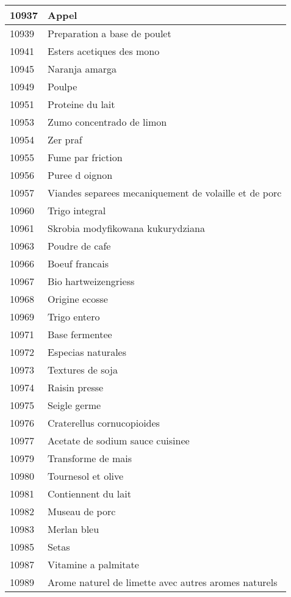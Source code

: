 \begin{longtable}{|l|l|}
10937 & Appel \\ \hline 
10939 & Preparation a base de poulet \\ \hline 
10941 & Esters acetiques des mono \\ \hline 
10945 & Naranja amarga \\ \hline 
10949 & Poulpe \\ \hline 
10951 & Proteine du lait \\ \hline 
10953 & Zumo concentrado de limon \\ \hline 
10954 & Zer praf \\ \hline 
10955 & Fume par friction \\ \hline 
10956 & Puree d oignon \\ \hline 
10957 & Viandes separees mecaniquement de volaille et de porc \\ \hline 
10960 & Trigo integral \\ \hline 
10961 & Skrobia modyfikowana kukurydziana \\ \hline 
10963 & Poudre de cafe \\ \hline 
10966 & Boeuf francais \\ \hline 
10967 & Bio hartweizengriess \\ \hline 
10968 & Origine ecosse \\ \hline 
10969 & Trigo entero \\ \hline 
10971 & Base fermentee \\ \hline 
10972 & Especias naturales \\ \hline 
10973 & Textures de soja \\ \hline 
10974 & Raisin presse \\ \hline 
10975 & Seigle germe \\ \hline 
10976 & Craterellus cornucopioides \\ \hline 
10977 & Acetate de sodium sauce cuisinee \\ \hline 
10979 & Transforme de mais \\ \hline 
10980 & Tournesol et olive \\ \hline 
10981 & Contiennent du lait \\ \hline 
10982 & Museau de porc \\ \hline 
10983 & Merlan bleu \\ \hline 
10985 & Setas \\ \hline 
10987 & Vitamine a palmitate \\ \hline 
10989 & Arome naturel de limette avec autres aromes naturels \\ \hline 

\end{longtable}
